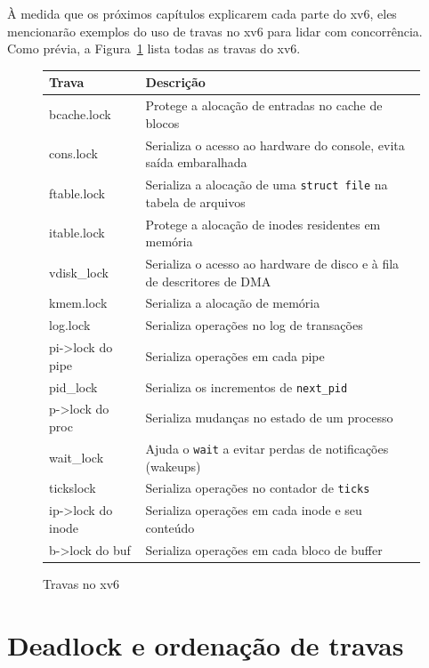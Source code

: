 À medida que os próximos capítulos explicarem cada parte do xv6,
eles mencionarão exemplos do uso de travas no xv6
para lidar com concorrência.
Como prévia,
a Figura~\ref{fig:locktable}
lista todas as travas do xv6.

\begin{figure}[t]
\center
\begin{tabular}{ll}
{\bf Trava} & {\bf Descrição} \\
\midrule
bcache.lock & Protege a alocação de entradas no cache de blocos \\
cons.lock & Serializa o acesso ao hardware do console, evita saída embaralhada \\
ftable.lock & Serializa a alocação de uma \texttt{struct file} na tabela de arquivos \\
itable.lock & Protege a alocação de inodes residentes em memória \\
vdisk\_lock & Serializa o acesso ao hardware de disco e à fila de descritores de DMA \\
kmem.lock & Serializa a alocação de memória \\
log.lock & Serializa operações no log de transações \\
pi->lock do pipe & Serializa operações em cada pipe \\
pid\_lock & Serializa os incrementos de \texttt{next\_pid} \\
p->lock do proc & Serializa mudanças no estado de um processo \\
wait\_lock & Ajuda o \texttt{wait} a evitar perdas de notificações (wakeups) \\
tickslock & Serializa operações no contador de \texttt{ticks} \\
ip->lock do inode & Serializa operações em cada inode e seu conteúdo \\
b->lock do buf & Serializa operações em cada bloco de buffer \\
\end{tabular}
\caption{Travas no xv6}
\label{fig:locktable}
\end{figure}

\section{Deadlock e ordenação de travas}

